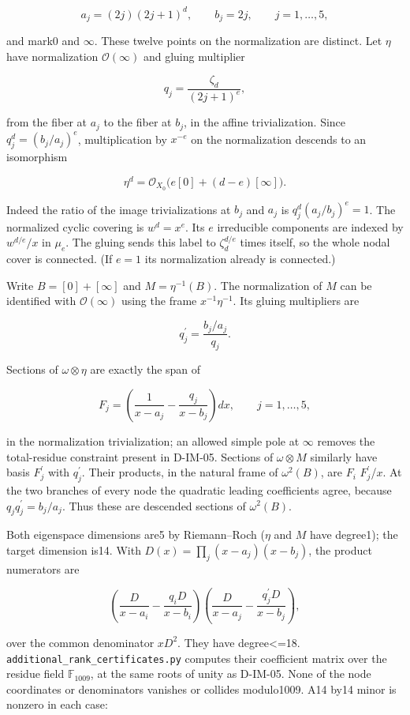 \[
a_j=(2j)(2j+1)^d,\qquad b_j=2j,\qquad j=1,\ldots,5,
\]

and mark0 and \(\infty\). These twelve points on the normalization are distinct. Let \(\eta\) have normalization \(\mathcal O(\infty)\) and gluing multiplier

\[
q_j=\frac{\zeta_d}{(2j+1)^e},
\]

from the fiber at \(a_j\) to the fiber at \(b_j\), in the affine trivialization. Since \(q_j^d=(b_j/a_j)^e\), multiplication by \(x^{-e}\) on the normalization descends to an isomorphism

\[
\eta^d=\mathcal O_{X_0}\bigl(e[0]+(d-e)[\infty]\bigr).
\]

Indeed the ratio of the image trivializations at \(b_j\) and \(a_j\) is \(q_j^d(a_j/b_j)^e=1\). The normalized cyclic covering is \(w^d=x^e\). Its \(e\) irreducible components are indexed by \(w^{d/e}/x\) in \(\mu_e\). The gluing sends this label to \(\zeta_d^{d/e}\) times itself, so the whole nodal cover is connected. (If \(e= 1\) its normalization already is connected.)

Write \(B=[0]+[\infty]\) and \(M=\eta^{-1}(B)\). The normalization of \(M\) can be identified with \(\mathcal O(\infty)\) using the frame \(x^{-1}\eta^{-1}\). Its gluing multipliers are

\[
q_j^{\prime}=\frac{b_j/a_j}{q_j}.
\]

Sections of \(\omega\otimes\eta\) are exactly the span of

\[
F_j=\left(\frac1{x-a_j}-\frac{q_j}{x-b_j}\right)dx,\qquad j=1,\ldots,5,
\]

in the normalization trivialization; an allowed simple pole at \(\infty\) removes the total-residue constraint present in D-IM-05. Sections of \(\omega\otimes M\) similarly have basis \(F_j^{\prime}\) with \(q_j^{\prime}\). Their products, in the natural frame of \(\omega^2(B)\), are \(F_i\) \(F_j^{\prime}\)/\(x\). At the two branches of every node the quadratic leading coefficients agree, because \(q_jq_j^{\prime}=b_j/a_j\). Thus these are descended sections of \(\omega^2(B)\).

Both eigenspace dimensions are5 by Riemann--Roch (\(\eta\) and \(M\) have degree1); the target dimension is14. With \(D(x)=\prod_j(x-a_j)(x-b_j)\), the product numerators are

\[
\left(\frac D{x-a_i}-\frac{q_iD}{x-b_i}\right)\left(\frac D{x-a_j}-\frac{q_j^{\prime}D}{x-b_j}\right),
\]

over the common denominator \(xD^2\). They have degree\textless{}=18. \texttt{additional\_rank\_certificates.py} computes their coefficient matrix over the residue field \(\mathbb F_{1009}\), at the same roots of unity as D-IM-05. None of the node coordinates or denominators vanishes or collides modulo1009. A14 by14 minor is nonzero in each case:

